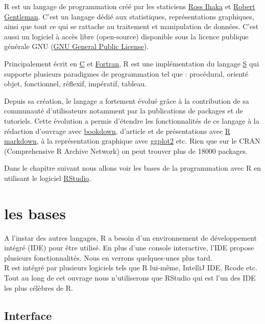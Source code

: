 \documentclass[
]{book}
\begin{document}
R est un langage de programmation créé par les staticiens \href{https://en.wikipedia.org/wiki/Ross_Ihaka}{Ross Ihaka} et \href{https://en.wikipedia.org/wiki/Robert_Gentleman_(statistician)}{Robert Gentleman}.
C'est un langage dédié aux statistiques, représentations graphiques, ainsi que tout ce qui se rattache au traitement et manipulation de données. C'est aussi un logiciel à accès libre (open-source) disponible sous la licence publique générale GNU (\href{https://en.wikipedia.org/wiki/GNU_General_Public_License}{GNU General Public License}).

Principalement écrit en \href{https://en.wikipedia.org/wiki/C_(programming_language)}{C} et \href{https://en.wikipedia.org/wiki/Fortran}{Fortran}, R est une implémentation du langage \href{https://en.wikipedia.org/wiki/S_(programming_language)}{S} qui supporte plusieurs paradigmes de programmation tel que : procédural, orienté objet, fonctionnel, réflexif, impératif, tableau.

Depuis sa création, le langage a fortement évolué grâce à la contribution de sa communauté d'utilisateurs notamment par la publications de packages et de tutoriels. Cette évolution a permis d'étendre les fonctionnalités de ce langage à la rédaction d'ouvrage avec \href{https://bookdown.org/}{bookdown}, d'article et de présentations avec \href{https://rmarkdown.rstudio.com/}{R markdown}, à la représentation graphique avec \href{https://ggplot2.tidyverse.org/reference/geom_bar.html}{ggplot2} etc.
Rien que sur le CRAN (Comprehensive R Archive Network) on peut trouver plus de 18000 packages.

Dans le chapitre suivant nous allons voir les bases de la programmation avec R en utilisant le logiciel \href{https://www.rstudio.com/}{RStudio}.

\hypertarget{base}{%
\chapter{les bases}\label{base}}

A l'instar des autres langages, R a besoin d'un environnement de développement intégré (IDE) pour être utilisé. En plus d'une console interactive, l'IDE propose plusieurs fonctionnalités. Nous en verrons quelques-unes plus tard.\\
R est intégré par plusieurs logiciels tels que R lui-même, IntelliJ IDE, Rcode etc. Tout au long de cet ouvrage nous n'utiliserons que RStudio qui est l'un des IDE les plus célèbres de R.

\hypertarget{interface}{%
\section{Interface}\label{interface}}
\end{document}
